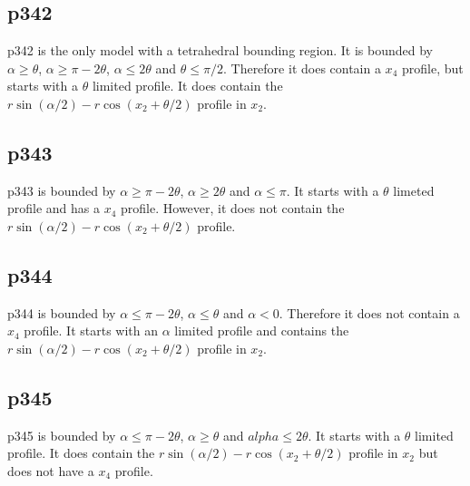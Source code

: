 \subsection{p342} \label{p342}

p342 is the only model with a tetrahedral bounding region. It is bounded by $\alpha \ge \theta$, $\alpha \ge \pi - 2\theta$, $\alpha \le 2\theta$ and $\theta \le \pi/2$. Therefore it does contain a $x_4$ profile, but starts with a $\theta$ limited profile. It does contain the $r\sin(\alpha/2) - r\cos(x_2 + \theta/2)$ profile in $x_2$.



\subsection{p343} \label{p343}

p343 is bounded by $\alpha \ge \pi - 2\theta$,  $\alpha \ge 2\theta$ and $\alpha \le \pi$. It starts with a $\theta$ limeted profile and has a $x_4$ profile. However, it does not contain the $r\sin(\alpha/2) - r\cos(x_2 + \theta/2)$ profile.




\subsection{p344} \label{p344}

p344 is bounded by $\alpha \le \pi - 2\theta$, $\alpha \le \theta$ and $\alpha < 0$. Therefore it does not contain a $x_4$ profile. It starts with an $\alpha$ limited profile and contains the $r\sin(\alpha/2) - r\cos(x_2 + \theta/2)$ profile in $x_2$.




\subsection{p345} \label{p345}

p345 is bounded by $\alpha \le \pi - 2\theta$, $\alpha \ge \theta$ and $alpha \le 2\theta$. It starts with a $\theta$ limited profile. It does contain the $r\sin(\alpha/2) - r\cos(x_2 + \theta/2)$ profile in $x_2$ but does not have a $x_4$ profile.



